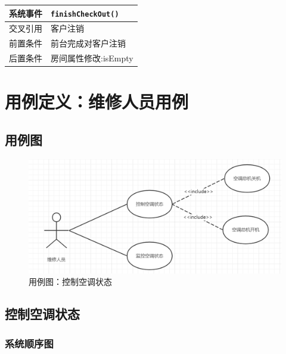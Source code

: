 \documentclass[black,normal,cn]{elegantnote}
\newcommand{\code}[1]{\colorbox{light-gray}{\texttt{#1}}}
\begin{document}
\begin{center}
    \begin{tabular}{|>{\centering}m{}|m{}|}
        \hline
        系统事件   & \multicolumn{1}{l|}{\code{finishCheckOut() }} \\
        \hline
        交叉引用   & 客户注销                                      \\
        \hline
        前置条件   & 前台完成对客户注销                            \\
        \hline
        {后置条件} & 房间属性修改:isEmpty                          \\
        \hline
    \end{tabular}
\end{center}

\section{用例定义：维修人员用例}

\subsection{用例图}

\begin{figure}[H]
    \centering
    \includegraphics[width=.9\textwidth]{fig/260007.png}
    \caption{用例图：控制空调状态}
    \label{fig:260001}
\end{figure}


\subsection{控制空调状态}
\subsubsection{系统顺序图}
\end{document}
